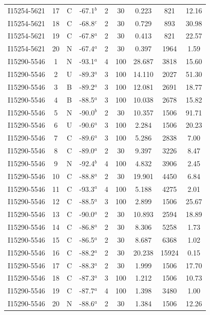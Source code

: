 \begin{table}
\begin{tabular}{ccccccccc}
I15254-5621 & 17 & C & -67.1$^{b}$ & 2 & 30 & 0.223 & 821 & 12.16 \\
I15254-5621 & 18 & C & -68.8$^{c}$ & 2 & 30 & 0.729 & 893 & 30.98 \\
I15254-5621 & 19 & C & -67.8$^{a}$ & 2 & 30 & 0.413 & 821 & 22.57 \\
I15254-5621 & 20 & N & -67.4$^{a}$ & 2 & 30 & 0.397 & 1964 & 1.59 \\
I15290-5546 & 1 & N & -93.1$^{a}$ & 4 & 100 & 28.687 & 3818 & 15.60 \\
I15290-5546 & 2 & U & -89.3$^{a}$ & 3 & 100 & 14.110 & 2027 & 51.30 \\
I15290-5546 & 3 & B & -89.2$^{a}$ & 3 & 100 & 12.081 & 2691 & 18.77 \\
I15290-5546 & 4 & B & -88.5$^{a}$ & 3 & 100 & 10.038 & 2678 & 15.82 \\
I15290-5546 & 5 & N & -90.0$^{b}$ & 2 & 30 & 10.357 & 1506 & 91.71 \\
I15290-5546 & 6 & U & -90.6$^{a}$ & 3 & 100 & 2.284 & 1506 & 20.23 \\
I15290-5546 & 7 & C & -89.6$^{a}$ & 3 & 100 & 5.286 & 2838 & 7.00 \\
I15290-5546 & 8 & C & -89.0$^{a}$ & 2 & 30 & 9.397 & 3226 & 8.47 \\
I15290-5546 & 9 & N & -92.4$^{b}$ & 4 & 100 & 4.832 & 3906 & 2.45 \\
I15290-5546 & 10 & C & -88.8$^{a}$ & 2 & 30 & 19.901 & 4450 & 6.84 \\
I15290-5546 & 11 & C & -93.3$^{a}$ & 4 & 100 & 5.188 & 4275 & 2.01 \\
I15290-5546 & 12 & C & -88.5$^{a}$ & 3 & 100 & 2.899 & 1506 & 25.67 \\
I15290-5546 & 13 & C & -90.0$^{a}$ & 2 & 30 & 10.893 & 2594 & 18.89 \\
I15290-5546 & 14 & C & -86.8$^{a}$ & 2 & 30 & 8.306 & 5258 & 1.73 \\
I15290-5546 & 15 & C & -86.5$^{a}$ & 2 & 30 & 8.687 & 6368 & 1.02 \\
I15290-5546 & 16 & C & -88.2$^{a}$ & 2 & 30 & 20.238 & 15924 & 0.15 \\
I15290-5546 & 17 & C & -88.3$^{a}$ & 2 & 30 & 1.999 & 1506 & 17.70 \\
I15290-5546 & 18 & C & -87.3$^{a}$ & 3 & 100 & 1.212 & 1506 & 10.73 \\
I15290-5546 & 19 & C & -87.7$^{a}$ & 4 & 100 & 1.398 & 3480 & 1.00 \\
I15290-5546 & 20 & N & -88.6$^{a}$ & 2 & 30 & 1.384 & 1506 & 12.26 \\

\end{tabular}
\end{table}
